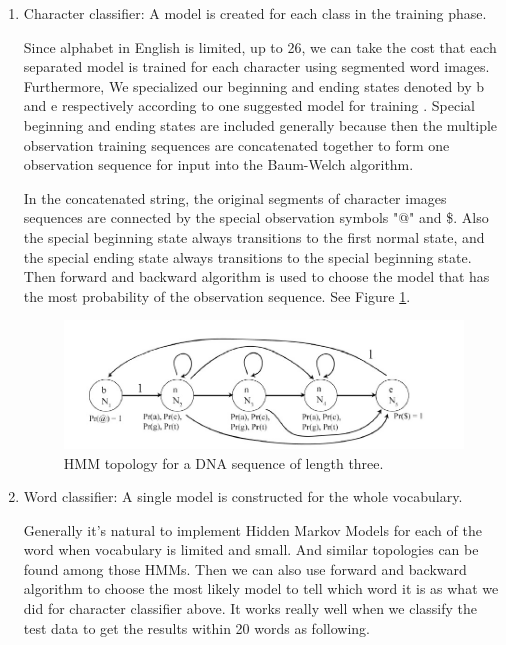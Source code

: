 \begin{enumerate}
\item	Character classifier: A model is created for each class in the training phase.

Since alphabet in English is limited, up to 26, we can take the cost that each separated model is trained for each character using segmented word images.
Furthermore, We specialized our beginning and ending states denoted by b and e respectively according to one suggested model for training \cite{Laan}.
Special beginning and ending states are included generally because then the multiple observation training sequences are concatenated together to form one observation sequence for input into the Baum-Welch algorithm\cite{Laan}.

In the concatenated string, the original segments of character images sequences are connected by the special observation symbols "@" and \$.
 Also the special beginning state always transitions to the first normal state, and the special ending state always transitions to the special beginning state. Then forward and backward algorithm is used to choose the model that has the most probability of the observation sequence. See Figure \ref{figure:DNAHMM}\cite{Laan}.

\begin{figure}[!t]
  \centering
  \includegraphics[width=5in]{topolopy_for_training}
  \caption{HMM topology for a DNA sequence of length three.}
  \label{figure:DNAHMM}
\end{figure}



\item	Word classifier: A single model is constructed for the whole vocabulary. 

Generally it’s natural to implement Hidden Markov Models for each of the word when vocabulary is limited and small. And similar topologies can be found among those HMMs. Then we can also use forward and backward algorithm to choose the most likely model to tell which word it is as what we did for character classifier above. It works really well when we classify the test data to get the results within 20 words as following.


\end{enumerate}
